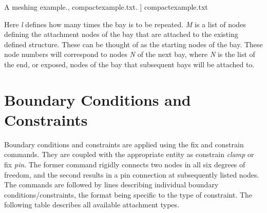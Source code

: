 \documentclass[12pt]{article}
\newcommand*{\sarg}[1]{\textit{#1}}
\newcommand*{\command}[1]{\textsf{#1}}
\newcommand*{\varg}[1]{\textit{#1}}
\newcommand{\includelisting}[2]{{\small\label{listing:#1}#2, #1. }]{ #1}}}
\begin{document}
%
 \includelisting{compactexample.txt}{A meshing example.}
 
 Here \sarg{l} defines how many times the bay is to be repeated.
 \varg{M} is a list of nodes defining the attachment nodes of the bay
 that are attached to the existing defined structure. These can be
 thought of as the starting nodes of the bay. These node numbers will
 correspond to nodes \varg{N} of the next bay, where \varg{N} is the
 list of the end, or exposed, nodes of the bay that subsequent bays
 will be attached to.
\section{Boundary Conditions and Constraints}\label{sec:bcnconstr}
Boundary conditions and constraints are applied using the
\command{fix} and \command{constrain} commands. They are coupled with
the appropriate entity as \command{constrain} \sarg{clamp} or
\command{fix} \sarg{pin}. The former command rigidly connects two
nodes in all six degrees of freedom, and the second results in a pin
connection at subsequently listed nodes. The commands are followed by
lines describing individual boundary conditions/constraints, the
format being specific to the type of constraint. The following table
describes all available attachment types.
\end{document}

